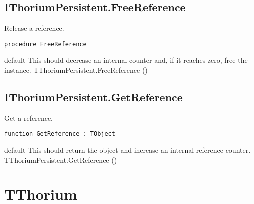 \subsection{IThoriumPersistent.FreeReference}
\label{thoriumcore:thorium:ithoriumpersistent:freereference}
\begin{FPCList}
\Synopsis
Release a reference.\Declaration 

\begin{verbatim}
procedure FreeReference
\end{verbatim}
\Visibility
default
\Description
This should decrease an internal counter and, if it reaches zero, free  the instance. \Errors
\SeeAlso
TThoriumPersistent.FreeReference (\pageref{thoriumcore:thorium:tthoriumpersistent:freereference})\end{FPCList}
\subsection{IThoriumPersistent.GetReference}
\label{thoriumcore:thorium:ithoriumpersistent:getreference}
\begin{FPCList}
\Synopsis
Get a reference.\Declaration 

\begin{verbatim}
function GetReference : TObject
\end{verbatim}
\Visibility
default
\Description
This should return the object and increase an internal reference counter. \Errors
\SeeAlso
TThoriumPersistent.GetReference (\pageref{thoriumcore:thorium:tthoriumpersistent:getreference})\end{FPCList}
\section{TThorium}
\label{thoriumcore:thorium:tthorium}
